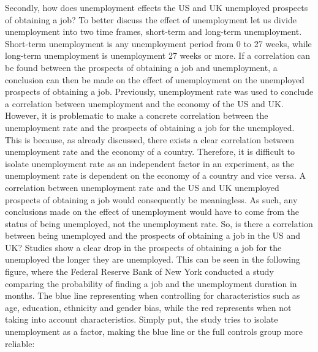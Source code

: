 Secondly, how does unemployment effects the US and UK unemployed prospects of obtaining a job?
To better discuss the effect of unemployment let us divide unemployment into two time frames, short-term and long-term unemployment.
Short-term unemployment is any unemployment period from 0 to 27 weeks, while long-term unemployment is unemployment 27 weeks or more.
If a correlation can be found between the prospects of obtaining a job and unemployment, a conclusion can then be made on the effect of unemployment on the unemployed prospects of obtaining a job.
Previously, unemployment rate was used to conclude a correlation between unemployment and the economy of the US and UK.
However, it is problematic to make a concrete correlation between the unemployment rate and the prospects of obtaining a job for the unemployed.
This is because, as already discussed, there exists a clear correlation between unemployment rate and the economy of a country.
Therefore, it is difficult to isolate unemployment rate as an independent factor in an experiment, as the unemployment rate is dependent on the economy of a country and vice versa.
A correlation between unemployment rate and the US and UK unemployed prospects of obtaining a job would consequently be meaningless.
As such, any conclusions made on the effect of unemployment would have to come from the status of being unemployed, not the unemployment rate.
So, is there a correlation between being unemployed and the prospects of obtaining a job in the US and UK?
Studies show a clear drop in the prospects of obtaining a job for the unemployed the longer they are unemployed.
This can be seen in the following figure, where the Federal Reserve Bank of New York conducted a study comparing the probability of finding a job and the unemployment duration in months.
The blue line representing when controlling for characteristics such as age, education, ethnicity and gender bias, while the red represents when not taking into account characteristics.
Simply put, the study tries to isolate unemployment as a factor, making the blue line or the full controls group more reliable: \\

